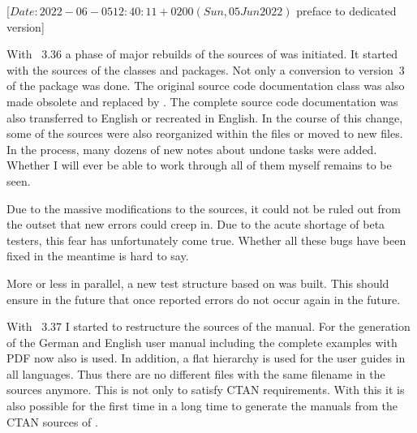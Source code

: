 %
%
%
%
%

                 [$Date: 2022-06-05 12:40:11 +0200 (Sun, 05 Jun 2022) $
                  preface to dedicated version]


With \KOMAScript~3.36 a phase of major rebuilds of the sources of
\KOMAScript{} was initiated. It started with the sources of the classes and
packages. Not only a conversion to version~3 of the package  was
done. The original source code documentation class  was also
made obsolete and replaced by . The complete
source code documentation was also transferred to English or recreated in
English. In the course of this change, some of the sources were also
reorganized within the files or moved to new files. In the process, many
dozens of new notes about undone tasks were added. Whether I will ever be able
to work through all of them myself remains to be seen.

Due to the massive modifications to the sources, it could not be ruled out
from the outset that new errors could creep in. Due to the acute shortage of
beta testers, this fear has unfortunately come true. Whether all these bugs
have been fixed in the meantime is hard to say.

More or less in parallel, a new test structure based on  was
built. This should ensure in the future that once reported errors do not occur
again in the future.

With \KOMAScript~3.37 I started to restructure the sources of the manual. For
the generation of the German and English user manual including the complete
examples with PDF now also  is used. In addition, a flat
hierarchy is used for the user guides in all languages. Thus there are no
different files with the same filename in the sources anymore. This is not
only to satisfy CTAN requirements. With this it is also possible for the first
time in a long time to generate the manuals from the CTAN sources of
\KOMAScript.

